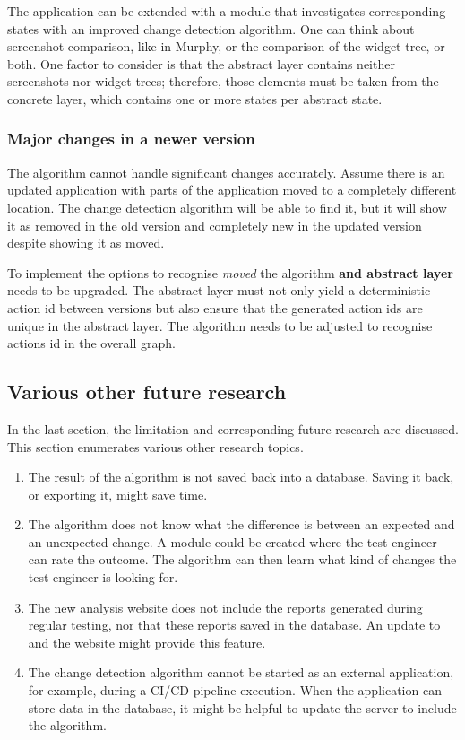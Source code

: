 The application can be extended with a module that investigates corresponding states with an improved change detection algorithm. One can think about screenshot comparison, like in Murphy, or the comparison of the widget tree, or both. One factor to consider is that the abstract layer contains neither screenshots nor widget trees; therefore, those elements must be taken from the concrete layer, which contains one or more states per abstract state. 

\subsubsection{Major changes in a newer version}
The algorithm cannot handle significant changes accurately. Assume there is an updated application with parts of the application moved to a completely different location. The change detection algorithm will be able to find it, but it will show it as removed in the old version and completely new in the updated version despite showing it as moved. 

To implement the options to recognise \textit{moved} the algorithm \textbf{and abstract layer} needs to be upgraded. The abstract layer must not only yield a deterministic action id between versions but also ensure that the generated action ids are unique in the abstract layer. The algorithm needs to be adjusted to recognise actions id in the overall graph. 
 
\subsection{Various other future research}
In the last section, the limitation and corresponding future research are discussed. This section enumerates various other research topics.

\begin{enumerate}
\item The result of the algorithm is not saved back into a database. Saving it back, or exporting it, might save time. 

\item The algorithm does not know what the difference is between an expected and an unexpected change. A module could be created where the test engineer can rate the outcome. The algorithm can then learn what kind of changes the test engineer is looking for. 

\item The new analysis website does not include the \testar reports generated during regular testing, nor that these reports saved in the database. An update to \testar and the website might provide this feature.

\item The change detection algorithm cannot be started as an external application, for example, during a CI/CD pipeline execution. When the application can store data in the database, it might be helpful to update the \dotnet server to include the algorithm. 

\end{enumerate}

